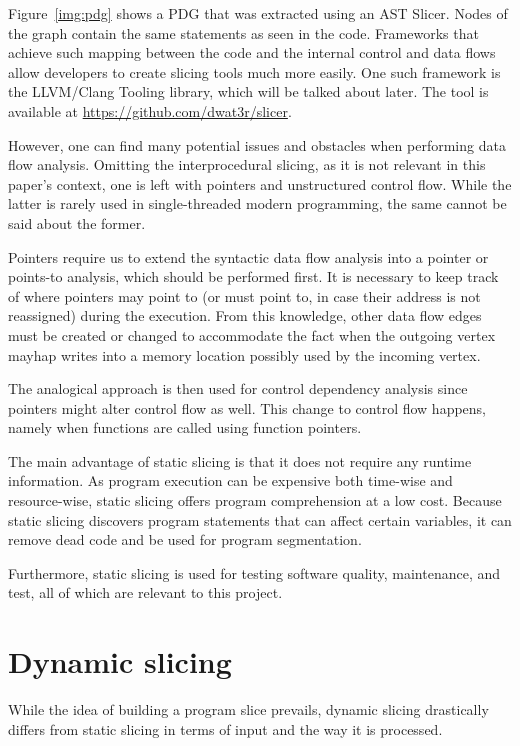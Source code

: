 Figure~\ref{img:pdg} shows a PDG that was extracted using an AST Slicer.
Nodes of the graph contain the same statements as seen in the code.
Frameworks that achieve such mapping between the code and the internal
control and data flows allow developers to create slicing tools much 
more easily.
One such framework is the LLVM/Clang Tooling library, which will be
talked about later.
The tool is available at \url{https://github.com/dwat3r/slicer}.

However, one can find many potential issues and obstacles when performing 
data flow analysis. 
Omitting the interprocedural slicing, as it is not relevant in this paper's
context, one is left with pointers and unstructured control flow.
While the latter is rarely used in single-threaded modern programming, 
the same cannot be said about the former. 

Pointers require us to extend the syntactic data flow analysis 
into a pointer or points-to analysis, which should be performed first. 
It is necessary to keep track of where pointers may point to (or must point to,
in case their address is not reassigned) during the execution. 
From this knowledge, other data flow edges must be created or
changed to accommodate the fact when the outgoing vertex mayhap writes
into a memory location possibly used by the incoming vertex. 

The analogical approach is then used for control dependency analysis since 
pointers might alter control flow as well. 
This change to control flow happens, namely when functions are called using 
function pointers.

The main advantage of static slicing is that it does not require
any runtime information. 
As program execution can be expensive both time-wise and resource-wise, 
static slicing offers program comprehension at a low cost. 
Because static slicing discovers program statements that can affect 
certain variables, it can remove dead code and be used for program segmentation. 

Furthermore, static slicing is used for testing software quality, maintenance, 
and test, all of which are relevant to this project.

\section{Dynamic slicing}

While the idea of building a program slice prevails, dynamic slicing 
drastically differs from static slicing in terms of input and the way
it is processed. 

